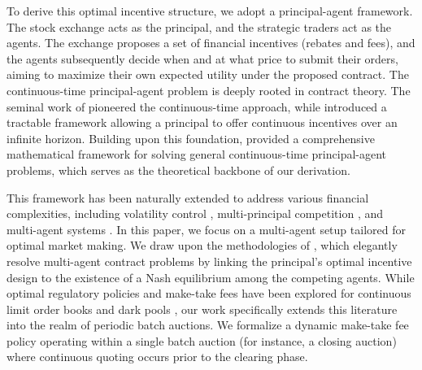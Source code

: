\documentclass[12pt]{article}
\begin{document}
To derive this optimal incentive structure, we adopt a principal-agent framework. The stock exchange acts as the principal, and the strategic traders act as the agents. The exchange proposes a set of financial incentives (rebates and fees), and the agents subsequently decide when and at what price to submit their orders, aiming to maximize their own expected utility under the proposed contract. The continuous-time principal-agent problem is deeply rooted in contract theory. The seminal work of \cite{holmstrom1987aggregation} pioneered the continuous-time approach, while \cite{sannikov2008continuous} introduced a tractable framework allowing a principal to offer continuous incentives over an infinite horizon. Building upon this foundation, \cite{cvitanic2018dynamic} provided a comprehensive mathematical framework for solving general continuous-time principal-agent problems, which serves as the theoretical backbone of our derivation.

This framework has been naturally extended to address various financial complexities, including volatility control \cite{cvitanic2018dynamic,chiusolo2024new}, multi-principal competition \cite{mastrolia2018principal,hu2023principal,euch2021optimal}, and multi-agent systems \cite{keun2008optimal,espinosa2015optimal}. In this paper, we focus on a multi-agent setup tailored for optimal market making. We draw upon the methodologies of \cite{elie2019contracting,hernandez2024principal,baldacci2023mean}, which elegantly resolve multi-agent contract problems by linking the principal's optimal incentive design to the existence of a Nash equilibrium among the competing agents. While optimal regulatory policies and make-take fees have been explored for continuous limit order books and dark pools \cite{euch2021optimal,baldacci2021optimal,larsson2023optimal}, our work specifically extends this literature into the realm of periodic batch auctions. We formalize a dynamic make-take fee policy operating within a single batch auction (for instance, a closing auction) where continuous quoting occurs prior to the clearing phase.

\bigskip
\end{document}
